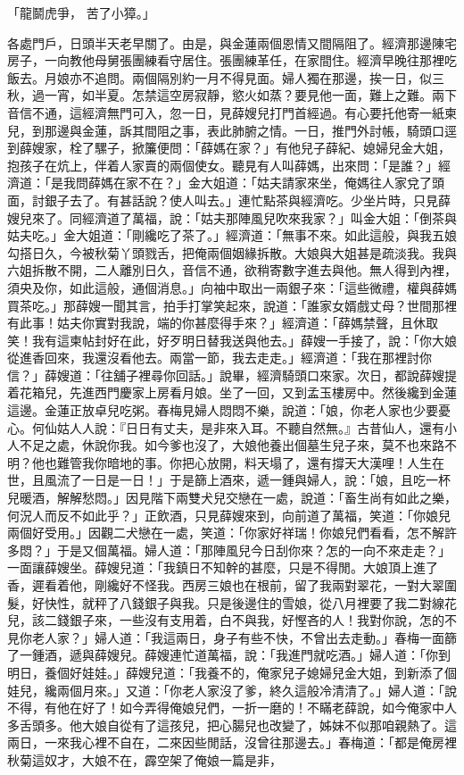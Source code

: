 \begin{showcontents}{}
「龍鬬虎爭，  苦了小獐。」

各處門戶，日頭半天老早關了。由是，與金蓮兩個恩情又間隔阻了。經濟那邊陳宅房子，一向教他母舅張團練看守居住。張團練革任，在家間住。經濟早晚往那裡吃飯去。月娘亦不追問。兩個隔別約一月不得見面。婦人獨在那邊，挨一日，似三秋，過一宵，如半夏。怎禁這空房寂靜，慾火如蒸？要見他一面，難上之難。兩下音信不通，這經濟無門可入，忽一日，見薛嫂兒打門首經過。有心要托他寄一紙柬兒，到那邊與金蓮，訴其間阻之事，表此肺腑之情。一日，推門外討帳，騎頭口逕到薛嫂家，栓了騾子，掀簾便問：「薛媽在家？」有他兒子薛紀、媳婦兒金大姐，抱孩子在炕上，伴着人家賣的兩個使女。聽見有人叫薛媽，出來問：「是誰？」經濟道：「是我問薛媽在家不在？」金大姐道：「姑夫請家來坐，俺媽往人家兌了頭面，討銀子去了。有甚話說？使人叫去。」連忙點茶與經濟吃。少坐片時，只見薛嫂兒來了。同經濟道了萬福，說：「姑夫那陣風兒吹來我家？」叫金大姐：「倒茶與姑夫吃。」金大姐道：「剛纔吃了茶了。」經濟道：「無事不來。如此這般，與我五娘勾搭日久，今被秋菊丫頭戮舌，把俺兩個姻緣拆散。大娘與大姐甚是疏淡我。我與六姐拆散不開，二人離別日久，音信不通，欲稍寄數字進去與他。無人得到內裡，須央及你，如此這般，通個消息。」向袖中取出一兩銀子來：「這些微禮，權與薛媽買茶吃。」那薛嫂一聞其言，拍手打掌笑起來，說道：「誰家女婿戲丈母？世間那裡有此事！姑夫你實對我說，端的你甚麼得手來？」經濟道：「薛媽禁聲，且休取笑！我有這柬帖封好在此，好歹明日替我送與他去。」薛嫂一手接了，說：「你大娘從進香回來，我還沒看他去。兩當一節，我去走走。」經濟道：「我在那裡討你信？」薛嫂道：「往舖子裡尋你回話。」說畢，經濟騎頭口來家。次日，都說薛嫂提着花箱兒，先進西門慶家上房看月娘。坐了一回，又到孟玉樓房中。然後纔到金蓮這邊。金蓮正放卓兒吃粥。春梅見婦人悶悶不樂，說道：「娘，你老人家也少要憂心。何仙姑人人說：『日日有丈夫，是非來入耳。不聽自然無。』古昔仙人，還有小人不足之處，休說你我。如今爹也沒了，大娘他養出個墓生兒子來，莫不也來路不明？他也難管我你暗地的事。你把心放開，料天塌了，還有撐天大漢哩！人生在世，且風流了一日是一日！」于是篩上酒來，遞一鍾與婦人，說：「娘，且吃一杯兒暖酒，解解愁悶。」因見階下兩雙犬兒交戀在一處，說道：「畜生尚有如此之樂，何況人而反不如此乎？」正飲酒，只見薛嫂來到，向前道了萬福，笑道：「你娘兒兩個好受用。」因觀二犬戀在一處，笑道：「你家好祥瑞！你娘兒們看看，怎不解許多悶？」于是又個萬福。婦人道：「那陣風兒今日刮你來？怎的一向不來走走？」一面讓薛嫂坐。薛嫂兒道：「我鎮日不知幹的甚麼，只是不得閒。大娘頂上進了香，遲看着他，剛纔好不怪我。西房三娘也在根前，留了我兩對翠花，一對大翠圍髮，好快性，就秤了八錢銀子與我。只是後邊住的雪娘，從八月裡要了我二對線花兒，該二錢銀子來，一些沒有支用着，白不與我，好慳吝的人！我對你說，怎的不見你老人家？」婦人道：「我這兩日，身子有些不快，不曾出去走動。」春梅一面篩了一鍾酒，遞與薛嫂兒。薛嫂連忙道萬福，說：「我進門就吃酒。」婦人道：「你到明日，養個好娃娃。」薛嫂兒道：「我養不的，俺家兒子媳婦兒金大姐，到新添了個娃兒，纔兩個月來。」又道：「你老人家沒了爹，終久這般冷清清了。」婦人道：「說不得，有他在好了！如今弄得俺娘兒們，一折一磨的！不瞞老薛說，如今俺家中人多舌頭多。他大娘自從有了這孩兒，把心腸兒也改變了，姊妹不似那咱親熱了。這兩日，一來我心裡不自在，二來因些閒話，沒曾往那邊去。」春梅道：「都是俺房裡秋菊這奴才，大娘不在，霹空架了俺娘一篇是非，
\end{showcontents}
